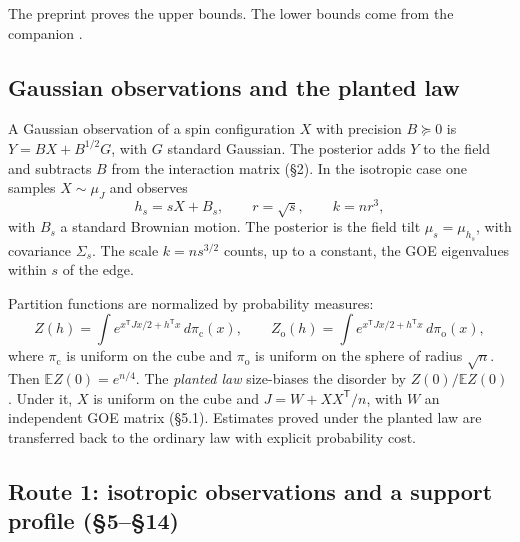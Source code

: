 \documentclass[11pt]{article}
\newcommand{\E}{\mathbb{E}}
\newcommand{\ploc}[2]{#1}
\begin{document}
The preprint proves the upper bounds. The lower bounds come from the companion
\cite{OAI-AcceptedCritical}.

\subsection{Gaussian observations and the planted law}

A Gaussian observation of a spin configuration $X$ with precision $B\succeq0$
is $Y=BX+B^{1/2}G$, with $G$ standard Gaussian. The posterior adds $Y$ to the
field and subtracts $B$ from the interaction matrix
\ploc{(\S2)}{model.tex:29--41}. In the isotropic case one samples
$X\sim\mu_J$ and observes
\[
 h_s=sX+B_s,\qquad r=\sqrt s,\qquad k=nr^3,
\]
with $B_s$ a standard Brownian motion. The posterior is the field tilt
$\mu_s=\mu_{h_s}$, with covariance $\Sigma_s$. The scale $k=ns^{3/2}$ counts,
up to a constant, the GOE eigenvalues within $s$ of the edge.

Partition functions are normalized by probability measures:
\[
 Z(h)=\int e^{x^{\mathsf T}Jx/2+h^{\mathsf T}x}\,d\pi_{\mathrm c}(x),
 \qquad
 Z_{\mathrm o}(h)=\int e^{x^{\mathsf T}Jx/2+h^{\mathsf T}x}\,d\pi_{\mathrm o}(x),
\]
where $\pi_{\mathrm c}$ is uniform on the cube and $\pi_{\mathrm o}$ is uniform
on the sphere of radius $\sqrt n$. Then $\E Z(0)=e^{n/4}$. The \emph{planted
law} size-biases the disorder by $Z(0)/\E Z(0)$. Under it, $X$ is uniform on
the cube and $J=W+XX^{\mathsf T}/n$, with $W$ an independent GOE matrix
\ploc{(\S5.1)}{profile-spectral.tex:40--65}. Estimates proved under the
planted law are transferred back to the ordinary law with explicit probability
cost.

\subsection{Route 1: isotropic observations and a support profile (\S5--\S14)}
\end{document}
